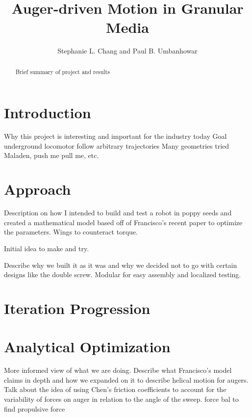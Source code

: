 \documentclass[letterpaper, 11 pt]{article}
\title{\Large \bf Auger-driven Motion in Granular Media}
\author{\centering Stephanie L. Chang and Paul B. Umbanhowar}
\begin{document}
\maketitle

\begin{abstract}
Brief summary of project and results
\end{abstract}

\tableofcontents

\section{Introduction}

Why this project is interesting and important for the industry today
Goal underground locomotor follow arbitrary trajectories
Many geometries tried Maladen, push me pull me, etc. 

\section{Approach}
Description on how I intended to build and test a robot in poppy seeds and created a mathematical model based off of Francisco's recent paper to optimize the parameters.  
Wings to counteract torque.

Initial idea to make and try.

Describe why we built it as it was and why we decided not to go with certain designs like the double screw. Modular for easy assembly and localized testing. 

\section{Iteration Progression}

\section{Analytical Optimization}
More informed view of what we are doing. 
Describe what Francisco's model claims in depth and how we expanded on it to describe helical motion for augers. 
Talk about the idea of using Chen's friction coefficients to account for the variability of forces on auger in relation to the angle of the sweep.  
force bal to find propulsive force
\end{document}
